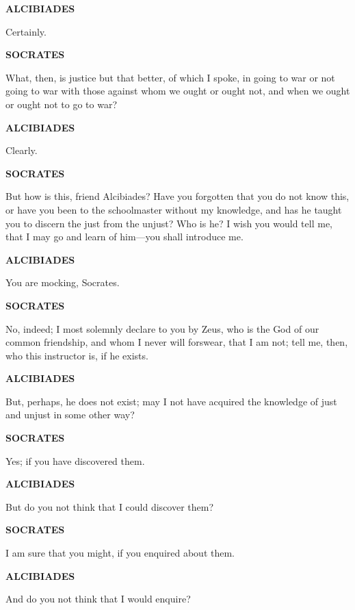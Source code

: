 \documentclass[11pt,letter]{article}
\begin{document}
\par \textbf{ALCIBIADES}
\par   Certainly.

\par \textbf{SOCRATES}
\par   What, then, is justice but that better, of which I spoke, in going to war or not going to war with those against whom we ought or ought not, and when we ought or ought not to go to war?

\par \textbf{ALCIBIADES}
\par   Clearly.

\par \textbf{SOCRATES}
\par   But how is this, friend Alcibiades? Have you forgotten that you do not know this, or have you been to the schoolmaster without my knowledge, and has he taught you to discern the just from the unjust? Who is he? I wish you would tell me, that I may go and learn of him—you shall introduce me.

\par \textbf{ALCIBIADES}
\par   You are mocking, Socrates.

\par \textbf{SOCRATES}
\par   No, indeed; I most solemnly declare to you by Zeus, who is the God of our common friendship, and whom I never will forswear, that I am not; tell me, then, who this instructor is, if he exists.

\par \textbf{ALCIBIADES}
\par   But, perhaps, he does not exist; may I not have acquired the knowledge of just and unjust in some other way?

\par \textbf{SOCRATES}
\par   Yes; if you have discovered them.

\par \textbf{ALCIBIADES}
\par   But do you not think that I could discover them?

\par \textbf{SOCRATES}
\par   I am sure that you might, if you enquired about them.

\par \textbf{ALCIBIADES}
\par   And do you not think that I would enquire?
\end{document}
